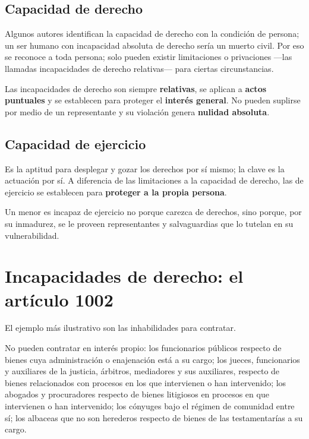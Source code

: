 \documentclass[12pt,oneside]{book}
\begin{document}
\subsection{Capacidad de derecho}

Algunos autores identifican la capacidad de derecho con la condición de persona; un ser humano con incapacidad absoluta de derecho sería un muerto civil. Por eso se reconoce a toda persona; solo pueden existir limitaciones o privaciones ---las llamadas incapacidades de derecho relativas--- para ciertas circunstancias.

\begin{importante}
Las incapacidades de derecho son siempre \textbf{relativas}, se aplican a \textbf{actos puntuales} y se establecen para proteger el \textbf{interés general}. No pueden suplirse por medio de un representante y su violación genera \textbf{nulidad absoluta}.
\end{importante}

\subsection{Capacidad de ejercicio}

Es la aptitud para desplegar y gozar los derechos por sí mismo; la clave es la actuación por sí. A diferencia de las limitaciones a la capacidad de derecho, las de ejercicio se establecen para \textbf{proteger a la propia persona}.

\begin{ejemplo}
Un menor es incapaz de ejercicio no porque carezca de derechos, sino porque, por su inmadurez, se le proveen representantes y salvaguardias que lo tutelan en su vulnerabilidad.
\end{ejemplo}

\section{Incapacidades de derecho: el artículo 1002}

El ejemplo más ilustrativo son las inhabilidades para contratar.

\begin{regla}
No pueden contratar en interés propio: los funcionarios públicos respecto de bienes cuya administración o enajenación está a su cargo; los jueces, funcionarios y auxiliares de la justicia, árbitros, mediadores y sus auxiliares, respecto de bienes relacionados con procesos en los que intervienen o han intervenido; los abogados y procuradores respecto de bienes litigiosos en procesos en que intervienen o han intervenido; los cónyuges bajo el régimen de comunidad entre sí; los albaceas que no son herederos respecto de bienes de las testamentarías a su cargo.
\end{regla}
\end{document}
